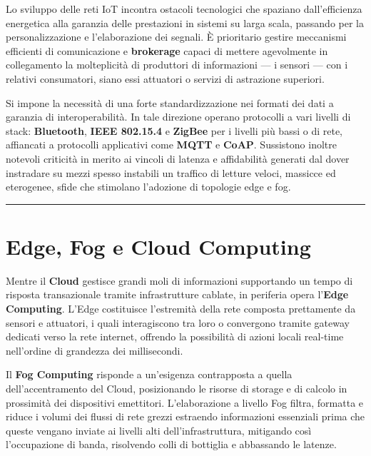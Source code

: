 \documentclass[
  italian,
  openany]{book}
\begin{document}
Lo sviluppo delle reti IoT incontra ostacoli tecnologici che spaziano
dall'efficienza energetica alla garanzia delle prestazioni in sistemi su
larga scala, passando per la personalizzazione e l'elaborazione dei
segnali. È prioritario gestire meccanismi efficienti di comunicazione e
\textbf{brokerage} capaci di mettere agevolmente in collegamento la
molteplicità di produttori di informazioni --- i sensori --- con i
relativi consumatori, siano essi attuatori o servizi di astrazione
superiori.

Si impone la necessità di una forte standardizzazione nei formati dei
dati a garanzia di interoperabilità. In tale direzione operano
protocolli a vari livelli di stack: \textbf{Bluetooth}, \textbf{IEEE
802.15.4} e \textbf{ZigBee} per i livelli più bassi o di rete,
affiancati a protocolli applicativi come \textbf{MQTT} e \textbf{CoAP}.
Sussistono inoltre notevoli criticità in merito ai vincoli di latenza e
affidabilità generati dal dover instradare su mezzi spesso instabili un
traffico di letture veloci, massicce ed eterogenee, sfide che stimolano
l'adozione di topologie edge e fog.

\begin{center}\rule{0.5\linewidth}{0.5pt}\end{center}

\section{Edge, Fog e Cloud Computing}\label{edge-fog-e-cloud-computing}

Mentre il \textbf{Cloud} gestisce grandi moli di informazioni
supportando un tempo di risposta transazionale tramite infrastrutture
cablate, in periferia opera l'\textbf{Edge Computing}. L'Edge
costituisce l'estremità della rete composta prettamente da sensori e
attuatori, i quali interagiscono tra loro o convergono tramite gateway
dedicati verso la rete internet, offrendo la possibilità di azioni
locali real-time nell'ordine di grandezza dei millisecondi.

Il \textbf{Fog Computing} risponde a un'esigenza contrapposta a quella
dell'accentramento del Cloud, posizionando le risorse di storage e di
calcolo in prossimità dei dispositivi emettitori. L'elaborazione a
livello Fog filtra, formatta e riduce i volumi dei flussi di rete grezzi
estraendo informazioni essenziali prima che queste vengano inviate ai
livelli alti dell'infrastruttura, mitigando così l'occupazione di banda,
risolvendo colli di bottiglia e abbassando le latenze.
\end{document}
